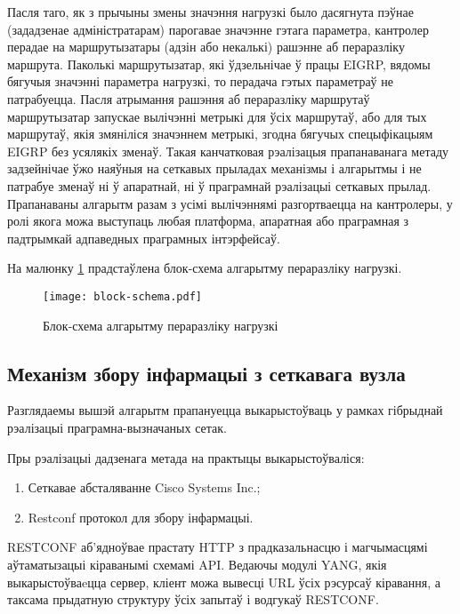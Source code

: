 Пасля таго, як з прычыны змены значэння нагрузкі было дасягнута пэўнае (зададзенае адміністратарам) парогавае значэнне гэтага параметра, кантролер перадае на маршрутызатары (адзін або некалькі) рашэнне
аб пераразліку маршрута. Паколькі маршрутызатар, які ўдзельнічае ў працы
EIGRP, вядомы бягучыя значэнні параметра нагрузкі, то перадача гэтых параметраў не патрабуецца. Пасля атрымання рашэння аб пераразліку маршрутаў
маршрутызатар запускае вылічэнні метрыкі для ўсіх маршрутаў, або для тых
маршрутаў, якія змяніліся значэннем метрыкі, згодна
бягучых спецыфікацыям EIGRP без усялякіх зменаў. Такая канчатковая рэалізацыя прапанаванага метаду задзейнічае ўжо наяўныя на сеткавых прыладах механізмы і алгарытмы і не патрабуе зменаў ні ў апаратнай, ні
ў праграмнай рэалізацыі сеткавых прылад. Прапанаваны алгарытм разам
з усімі вылічэннямі разгортваецца на кантролеры, у ролі якога можа
выступаць любая платформа, апаратная або праграмная з падтрымкай адпаведных праграмных інтэрфейсаў.

На малюнку \ref{img: block-schema} прадстаўлена блок-схема алгарытму пераразліку нагрузкі.

\clearpage

\begin{figure}[h!]
    \centering
    \texttt{[image: block-schema.pdf]}
    \caption{Блок-схема алгарытму пераразліку нагрузкі}
    \label{img: block-schema}
\end{figure}

\subsection{Механізм збору інфармацыі з сеткавага вузла}

Разглядаемы вышэй алгарытм прапануецца выкарыстоўваць у рамках гібрыднай
рэалізацыі праграмна-вызначаных сетак.

Пры рэалізацыі дадзенага метада на практыцы выкарыстоўваліся:
\begin{enumerate}
    \item Сеткавае абсталяванне Cisco Systems Inc.;
    \item Restconf протокол для збору інфармацыі.
\end{enumerate}

RESTCONF аб'ядноўвае прастату HTTP з прадказальнасцю і магчымасцямі аўтаматызацыі кіраванымі схемамі API. Ведаючы модулі YANG, якія выкарыстоўваeцца сервер, кліент можа вывесці URL ўсіх рэсурсаў кіравання, а таксама прыдатную структуру ўсіх запытаў і водгукаў RESTCONF.

